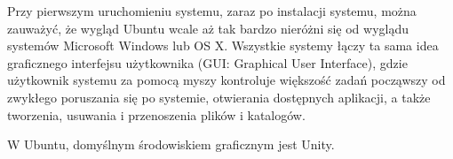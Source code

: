 
Przy pierwszym uruchomieniu systemu, zaraz po instalacji systemu, można zauważyć, że wygląd Ubuntu wcale aż tak bardzo nieróżni się od wyglądu systemów Microsoft Windows lub OS X. Wszystkie systemy łączy ta sama idea graficznego interfejsu użytkownika (\textcolor{ubuntu_orange}{GUI: Graphical User Interface}), gdzie użytkownik systemu za pomocą myszy kontroluje większość zadań począwszy od zwykłego poruszania się po systemie, otwierania dostępnych aplikacji, a także tworzenia, usuwania i przenoszenia plików i katalogów.

W Ubuntu, domyślnym środowiskiem graficznym jest Unity.